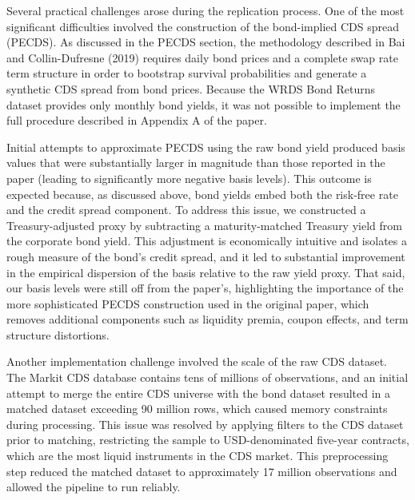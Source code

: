 \documentclass{article}
\begin{document}
Several practical challenges arose during the replication process. One of the most significant difficulties involved the construction of the bond-implied CDS spread (PECDS).
As discussed in the PECDS section, the methodology described in Bai and Collin-Dufresne (2019) requires daily bond prices and a complete swap rate term structure in order to bootstrap survival probabilities and generate a synthetic CDS spread from bond prices.
Because the WRDS Bond Returns dataset provides only monthly bond yields, it was not possible to implement the full procedure described in Appendix A of the paper.

Initial attempts to approximate PECDS using the raw bond yield produced basis values that were substantially larger in magnitude than those reported in the paper (leading to significantly more negative basis levels).
This outcome is expected because, as discussed above, bond yields embed both the risk-free rate and the credit spread component. To address this issue, we constructed a Treasury-adjusted proxy by subtracting a maturity-matched Treasury yield from the corporate bond yield.
This adjustment is economically intuitive and isolates a rough measure of the bond's credit spread, and it led to substantial improvement in the empirical dispersion of the basis relative to the raw yield proxy. That said, our basis levels were still off from the paper's, 
highlighting the importance of the more sophisticated PECDS construction used in the original paper, which removes additional components such as liquidity premia, coupon effects, and term structure distortions.

Another implementation challenge involved the scale of the raw CDS dataset. The Markit CDS database contains tens of millions of observations, and an initial attempt to merge the entire CDS universe with the bond dataset resulted in a matched dataset exceeding 90 million rows, which caused memory constraints during processing.
This issue was resolved by applying filters to the CDS dataset prior to matching, restricting the sample to USD-denominated five-year contracts, which are the most liquid instruments in the CDS market. This preprocessing step reduced the matched dataset to approximately 17 million observations and allowed the pipeline to run reliably.
\end{document}
